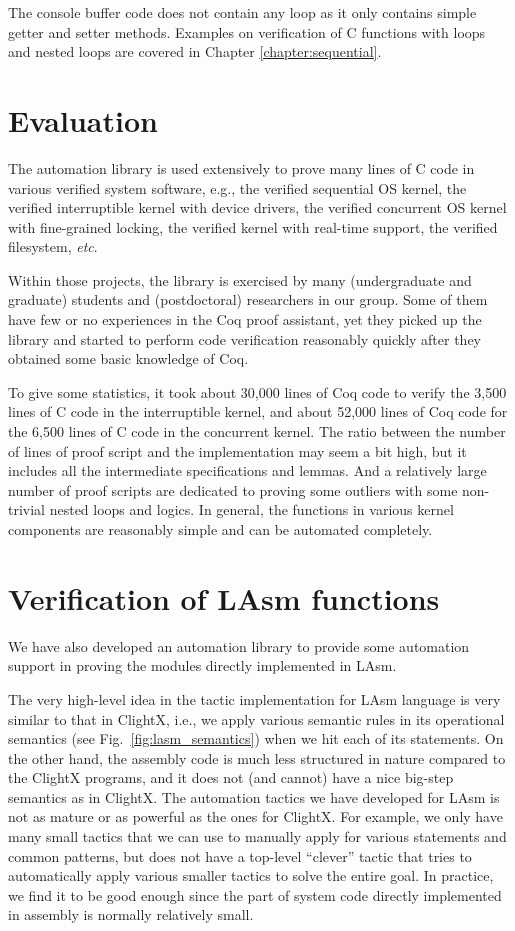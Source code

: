 The console buffer code does not contain any loop as it only contains simple
getter and setter methods. Examples on verification of C functions with loops and nested
loops are covered in Chapter \ref{chapter:sequential}.

\section{Evaluation}

The automation library is used extensively to prove many
lines of C code in various verified system software,
e.g., the verified sequential OS kernel, the verified
interruptible kernel with device drivers, the verified
concurrent OS kernel with fine-grained locking,
the verified kernel with real-time support, the verified filesystem, {\it etc}.

Within those projects, the library is exercised by many (undergraduate and graduate)
students and (postdoctoral) researchers in our group.
Some of them have few or no
experiences in the Coq proof
assistant, yet they picked up the library and started to perform code verification
reasonably quickly after they obtained some basic knowledge of Coq.

To give some statistics, it took about 30,000 lines of Coq code to verify
the 3,500 lines of C code in the interruptible kernel, and about
52,000 lines of Coq code for the 6,500 lines of C code in the concurrent kernel.
The ratio between the number of lines of proof script and the implementation
may seem a bit high, but it includes all the intermediate specifications and lemmas.
And a relatively large number of proof scripts are dedicated to proving some
outliers with some non-trivial nested loops and logics.
In general, the functions in various kernel components are reasonably simple and
can be automated completely.


\section{Verification of LAsm functions}
We have also developed an automation library to provide some
automation support in proving the modules directly implemented in LAsm.

The very high-level idea in the tactic implementation for LAsm language
is very similar to that in ClightX, i.e., we apply various semantic rules
in its operational semantics (see Fig.~\ref{fig:lasm_semantics}) when we
hit each of its statements.
On the other hand, the assembly code is much
less structured in nature compared to the ClightX programs, and it
does not (and cannot) have a nice big-step semantics as in ClightX.
The automation tactics we have developed for LAsm is not
as mature or as powerful as the ones for ClightX. For example, we only
have many small tactics that we can use to manually apply for various
statements and common patterns, but does not have a top-level ``clever''
tactic that tries to automatically apply various smaller tactics to
solve the entire goal. In practice, we find it to be good enough
since the part of system code directly implemented in assembly
is normally relatively small.